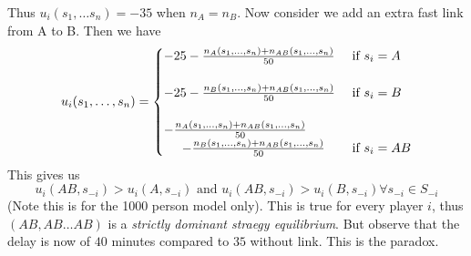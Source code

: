 \documentclass{article}
\theoremstyle{definition}
\begin{document}
 Thus $u_i(s_1,\dots s_n) = -35$ when $n_A = n_B$. Now consider we add an extra fast link from A to B. Then we have
\[
 u_i(s_1,\dots,s_n) = 
 \begin{cases}-25 - \frac{n_A(s_1,\dots,s_n)+n_{AB}(s_1,\dots,s_n)}{50} & \text{ if } s_i = A \\
 \\
  -25 - \frac{n_B(s_1,\dots,s_n)+n_{AB}(s_1,\dots,s_n)}{50} & \text{ if } s_i = B \\
  \\
   - \frac{n_A(s_1,\dots,s_n)+n_{AB}(s_1,\dots,s_n)}{50}\\
  \hspace{5mm} - \frac{n_B(s_1,\dots,s_n)+n_{AB}(s_1,\dots,s_n)}{50} & \text{ if } s_i = AB \\
  \end{cases}
 \]
 This gives us $$u_i(AB,s_{-i}) > u_i(A,s_{-i}) \text{ and } u_i(AB,s_{-i}) > u_i(B,s_{-i}) \forall s_{-i}\in S_{-i}$$ (Note this is for the 1000 person model only). This is true for every player $i$, thus $(AB,AB\dots AB)$ is a \textit{strictly dominant straegy equilibrium}. But observe that the delay is now of $40$ minutes compared to $35$ without link. This is the paradox.
\end{document}
